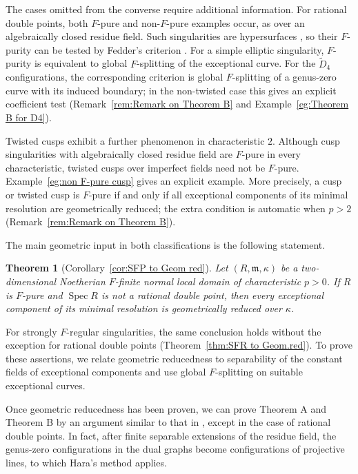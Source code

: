 \documentclass[12pt]{amsart}
\def\tilde{\widetilde}
\def\Spec{\operatorname{Spec}}
\def\m{{\mathfrak m}}
\theoremstyle{plain}
\theoremstyle{definition}
\theoremstyle{remark}
\newtheorem{defn and notation}[thm]{Definition and Notation}
\theoremstyle{plain}
\newtheorem{theo}{Theorem}
\numberwithin{equation}{thm}
\begin{document}
The cases omitted from the converse require additional information. For rational double points, both $F$-pure and non-$F$-pure examples occur, as over an algebraically closed residue field. Such singularities are hypersurfaces \cite[Proposition 3.9]{Sato-Takagi(generalhyperplane)}, so their $F$-purity can be tested by Fedder's criterion \cite{Fed}. For a simple elliptic singularity, $F$-purity is equivalent to global $F$-splitting of the exceptional curve. For the $\tilde D_4$ configurations, the corresponding criterion is global $F$-splitting of a genus-zero curve with its induced boundary; in the non-twisted case this gives an explicit coefficient test (Remark~\ref{rem:Remark on Theorem B} and Example~\ref{eg:Theorem B for D4}).

Twisted cusps exhibit a further phenomenon in characteristic $2$. Although cusp singularities with algebraically closed residue field are $F$-pure in every characteristic, twisted cusps over imperfect fields need not be $F$-pure. Example~\ref{eg:non F-pure cusp} gives an explicit example. More precisely, a cusp or twisted cusp is $F$-pure if and only if all exceptional components of its minimal resolution are geometrically reduced; the extra condition is automatic when $p>2$ (Remark~\ref{rem:Remark on Theorem B}).

The main geometric input in both classifications is the following statement.

\begin{theo}[Corollary~\ref{cor:SFP to Geom red}]
Let $(R,\m,\kappa)$ be a two-dimensional Noetherian $F$-finite normal local domain of characteristic $p>0$. If $R$ is $F$-pure and $\Spec R$ is not a rational double point, then every exceptional component of its minimal resolution is geometrically reduced over $\kappa$.
\end{theo}

For strongly $F$-regular singularities, the same conclusion holds without the exception for rational double points (Theorem~\ref{thm:SFR to Geom.red}). To prove these assertions, we relate geometric reducedness to separability of the constant fields of exceptional components and use global $F$-splitting on suitable exceptional curves. 

Once geometric reducedness has been proven, 
we can prove Theorem A and Theorem B by an argument similar to that in \cite{Hara(two-dim)}, except in the case of rational double points.
In fact, after finite separable extensions of the residue field, the genus-zero configurations in the dual graphs become configurations of projective lines, to which Hara's method applies.
\end{document}

